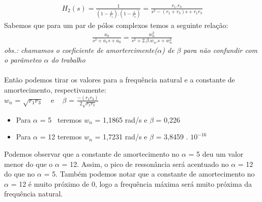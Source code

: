 \documentclass[a4paper,12pt,twoside]{article}
\begin{document}
\begin{equation}
\begin{split}
H_{2}(s)=\frac{1}{(1-\frac{s}{r_{1}}).(1-\frac{s}{r_{3}})} = \frac{r_{1}.r_{3}}{s^2-(r_{1}+r_{3})s+ r_{1}r_{3}}
\end{split}
\end{equation}
Sabemos que para um par de pólos complexos temos a seguinte relação:
\begin{equation}
\begin{split}
\frac{a_{0}}{s^2+a_{1}s+a_{0}} = \frac{w_{n}^2}{s^2+2.\beta.w_{n}.s+w_{n}^2} 
\end{split}
\end{equation}
\textit{ {\small obs.: chamamos o coeficiente de amortercimente($\alpha$) de $\beta$ para não confundir com o parâmeteo $\alpha$ do trabalho}}\\ \\

\noindent Então podemos tirar os valores para a frequência natural e a constante de amortecimento, respectivamente:\\

$w_{n}$ = $\sqrt{r_{1}r_{3}}$ \,\,\, e \,\,\, $\beta$ = $\frac{-(r_{1}r_{3})}{2\sqrt{r_{1}r_{3}}}$  \\ 
\begin{itemize}
    \item  Para $\alpha$ = 5 \, teremos  $w_{n}$ = 1,1865 rad/s e $\beta$ = 0,226 
\end{itemize}
\begin{itemize}
\item Para $\alpha$ = 12 teremos $w_{n}$ = 1,7231 rad/s e $\beta$ = 3,8459  . $10^{-16}$
\end{itemize}

Podemos observar que a constante de amortecimento no $\alpha$ = 5 deu um valor menor do que o $\alpha$ = 12. Assim, o pico de ressonância será acentuado no $\alpha$ = 12 do que no $\alpha$ = 5. Também podemos notar que a constante de amortecimento no $\alpha$ = 12 é muito próximo de 0, logo a frequência máxima será muito próxima da frequência natural. 
\\ \\ 
\end{document}
